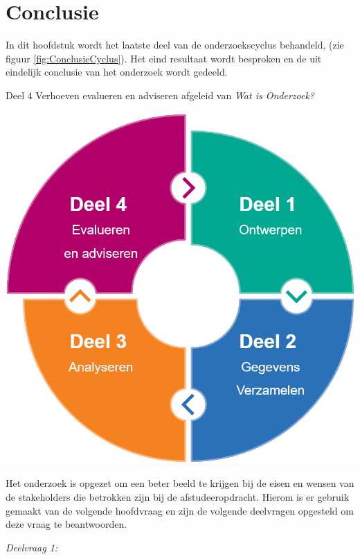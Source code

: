 \chapter{Conclusie}
In dit hoofdstuk wordt het laatste deel van de onderzoekscyclus behandeld,  (zie figuur \ref{fig:ConclusieCyclus}).
Het eind resultaat wordt besproken en de uit eindelijk conclusie van het onderzoek wordt gedeeld.

\begin{graphic}
	\vspace{0.2cm}
	\captionsetup{type=figure}
	\caption{Deel 4 Verhoeven evalueren en adviseren afgeleid van \textit{Wat is Onderzoek?}}
	\includegraphics[scale=0.3]{img/EvaluerenCyclus.png}
	\label{fig:ConclusieCyclus}
	\vspace{0.2cm}
\end{graphic}

\whitespace
Het onderzoek is opgezet om een beter beeld te krijgen bij de eisen en wensen van de stakeholders die betrokken zijn bij de afstudeeropdracht.
Hierom is er gebruik gemaakt van de volgende hoofdvraag \textit{\MainQuestion} en zijn de volgende deelvragen opgesteld om deze vraag te beantwoorden.
\newpage

\begin{center}
	\textit{Deelvraag 1: \SubquestionOne}
\end{center}

